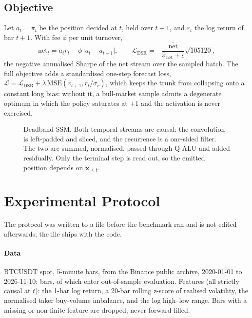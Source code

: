 \documentclass[conference]{IEEEtran}
\begin{document}
\subsection{Objective}
Let $a_t=\pi_t$ be the position decided at $t$, held over $t+1$, and $r_t$ the
log return of bar $t+1$. With fee $\phi$ per unit turnover,
\begin{equation}
\mathrm{net}_t=a_t r_t-\phi\,|a_t-a_{t-1}|,
\qquad
\mathcal{L}_{\mathrm{DSR}}=-\frac{\overline{\mathrm{net}}}{\widehat{\sigma}_{\mathrm{net}}+\epsilon}\sqrt{105120},
\label{eq:loss}
\end{equation}
the negative annualised Sharpe of the net stream over the sampled batch. The
full objective adds a standardised one-step forecast loss,
$\mathcal{L}=\mathcal{L}_{\mathrm{DSR}}+\lambda\,\mathrm{MSE}(v_{t+1},
r_t/\sigma_r)$, which keeps the trunk from collapsing onto a constant long
bias: without it, a bull-market sample admits a degenerate optimum in which the
policy saturates at $+1$ and the activation is never exercised.

\begin{figure}[t]
\centering
\resizebox{0.98\textwidth}{!}{}
\caption{Deadband-SSM. Both temporal streams are causal: the convolution is
left-padded and sliced, and the recurrence is a one-sided filter. The two are
summed, normalised, passed through Q-ALU and added residually. Only the
terminal step is read out, so the emitted position depends on
$\mathbf{x}_{\le t}$.}
\label{fig:arch}
\end{figure}

\section{Experimental Protocol}
\label{sec:protocol}

The protocol was written to a file before the benchmark ran and is not edited
afterwards; the file ships with the code.

\paragraph{Data}
BTCUSDT spot, 5-minute bars, from the Binance public archive, 2020-01-01 to
2026-11-10: \nSample{} bars, of which \nBars{} enter out-of-sample evaluation. Features (all strictly causal at $t$): the 1-bar log
return, a 20-bar rolling z-score of realised volatility, the normalised taker
buy-volume imbalance, and the log high--low range. Bars with a missing or
non-finite feature are dropped, never forward-filled.
\end{document}
